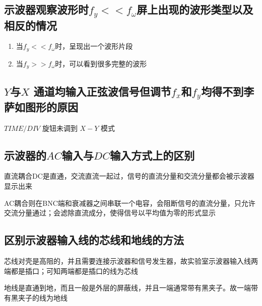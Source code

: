 \documentclass[UTF8]{ctexart}
\begin{document}
\subsection{示波器观察波形时$f_y << f_{\omega
}$屏上出现的波形类型以及相反的情况}
\begin{enumerate}
    \item 当$f_y << f_{\omega}$时，呈现出一个波形片段
    \item 当$f_y >> f_{\omega}$时，可以看到很多完整的波形
\end{enumerate}

\subsection{$Y$与$X$ 通道均输入正弦波信号但调节$f_x$和$f_y$均得不到李萨如图形的原因}
$TIME/DIV$ 旋钮未调到 $X-Y$ 模式


\subsection{示波器的$AC$输入与$DC$输入方式上的区别}
直流耦合DC是直通，交流直流一起过，信号的直流分量和交流分量都会被示波器显示出来

AC耦合则在BNC端和衰减器之间串联一个电容，会阻断信号的直流分量，只允许交流分量通过；会滤除直流成分，使得信号以平均值为零的形式显示

\subsection{区别示波器输入线的芯线和地线的方法}
芯线对壳是高阻的，并且需要连接示波器和信号发生器，故实验室示波器输入线两端都是插口；可知两端都是插口的线为芯线

地线是直通到地，而且一般是外层的屏蔽线，并且一端通常带有黑夹子。故一端带有黑夹子的线为地线
\end{document}
